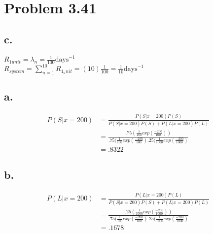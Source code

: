 \documentclass[12pt]{article}
\begin{document}
\section*{Problem 3.41}
\subsection*{c.}
$R_{1 unit} = \lambda_n = \frac{1}{100} \textrm{days}^{-1}$ \\
$R_{system} = \sum_{n=1}^{10} R_{1_unit} = (10)\frac{1}{100} = \frac{1}{10} \textrm{days}^{-1}$

\subsection*{a.}
\begin{align*}
  P(S|x=200) &= \frac{P(S|x=200)P(S)}{P(S|x=200)P(S)+P(L|x=200)P(L)} \\
  &= \frac{.75(\frac{1}{100}exp(\frac{-200}{100}))}{.75(\frac{1}{100}exp(\frac{-200}{100})
    .25(\frac{1}{1000}exp(\frac{-200}{1000})} \\
  &= .8322
\end{align*}

\subsection*{b.}
\begin{align*}
  P(L|x=200) &= \frac{P(L|x=200)P(L)}{P(S|x=200)P(S)+P(L|x=200)P(L)} \\
  &= \frac{.25(\frac{1}{1000}exp(\frac{-200}{1000}))}{.75(\frac{1}{100}exp(\frac{-200}{100})
    .25(\frac{1}{1000}exp(\frac{-200}{1000})} \\
  &= .1678
\end{align*}
\end{document}
